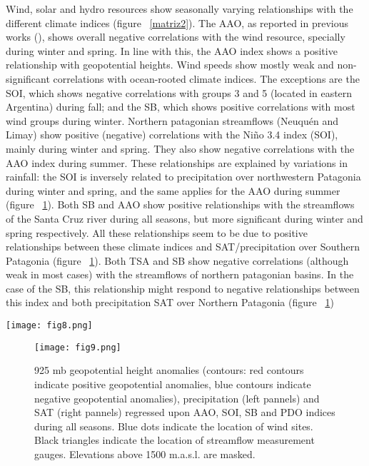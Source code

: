 \documentclass[AMA,Times1COL]{WileyNJDv5} %
\begin{document}
\begin{linenumbers}
Wind, solar and hydro resources show seasonally varying relationships with the different climate indices (figure ~\ref{matriz2}). The AAO, as reported in previous works (\cite{bianchi2022assessing}), shows overall negative correlations with the wind resource, specially during winter and spring. In line with this, the AAO index shows a positive relationship with geopotential heights. Wind speeds show mostly weak and non-significant correlations with ocean-rooted climate indices. The exceptions are the SOI, which shows negative correlations with groups 3 and 5 (located in eastern Argentina) during fall; and the SB, which shows positive correlations with most wind groups during winter. Northern patagonian streamflows (Neuquén and Limay) show positive (negative) correlations with the Niño 3.4 index (SOI), mainly during  winter and spring. They also show negative correlations with the AAO index during summer. These relationships are explained by variations in rainfall: the SOI is inversely related to precipitation over northwestern Patagonia during winter and spring, and the same applies for the AAO during summer (figure ~\ref{reg2}). Both SB and AAO show positive relationships with the streamflows of the Santa Cruz river during all seasons, but more significant during winter and spring respectively. All these relationships seem to be due to positive relationships between these climate indices and SAT/precipitation over Southern Patagonia (figure ~\ref{reg2}). Both TSA and SB show negative correlations (although weak in most cases) with the streamflows of northern patagonian basins. In the case of the SB, this relationship might respond to negative relationships between this index and both precipitation SAT over Northern Patagonia (figure ~\ref{reg2})

\begin{figure*}[hbpt]
	\centering
	\hspace*{-1cm}   
	\texttt{[image: fig8.png]}
	\caption{\label{matriz2} Correlation matrices between three-monthy (seasonal) mean climate indices and solar, wind and hydro time series.}
\end{figure*}


\begin{figure}[htbp]
	\centering
	\texttt{[image: fig9.png]} %
	\caption{\label{reg2} 925 mb geopotential height anomalies (contours: red contours indicate positive geopotential anomalies, blue contours indicate negative geopotential anomalies), precipitation (left pannels) and SAT (right pannels) regressed upon AAO, SOI, SB and PDO indices during all seasons. Blue dots indicate the location of wind sites. Black triangles indicate the location of streamflow measurement gauges. Elevations above 1500 m.a.s.l. are masked.}
\end{figure}


\end{linenumbers}
\end{document}
